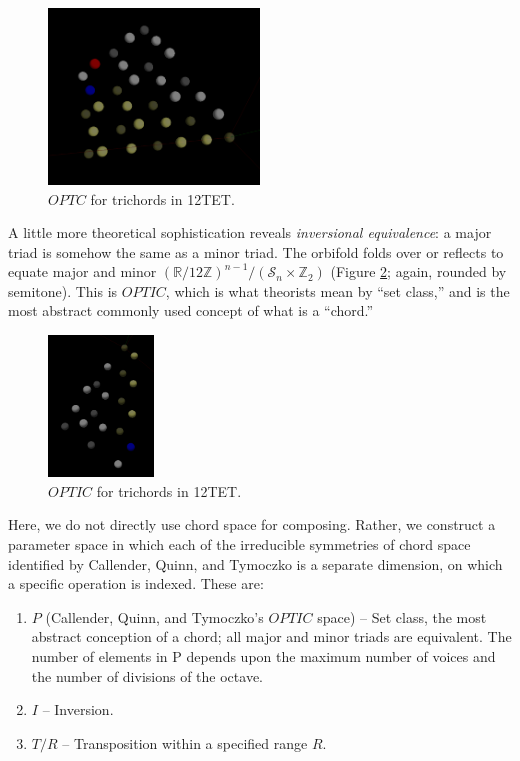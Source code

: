 \documentclass[english,11pt,letterpaper,onecolumn]{scrartcl}
\numberwithin{equation}{section}
\begin{document}
\begin{figure}
\centerline{\includegraphics[width = 0.5\textwidth]{opttc}}
\caption{\label{fig:opttc}
  $OPTC$ for trichords in 12TET.}
\end{figure}

A little more theoretical sophistication reveals \textit{inversional
equivalence}: a major triad is somehow the same as a minor triad. The orbifold
folds over or reflects to equate major and minor
$\left(\mathbb{R}/12\mathbb{Z}\right)^{n-1}/(\mathcal{S}_{n} \times
\mathbb{Z}_{2})$ (Figure \ref{fig:optic}; again, rounded by semitone). This is
$OPTIC$, which is what theorists mean by ``set class,'' and is the most abstract
commonly used concept of what is a ``chord.''

\begin{figure}
\centerline{\includegraphics[width = 0.25\textwidth]{opttic}}
\caption{\label{fig:optic}
  $OPTIC$ for trichords in 12TET.}
\end{figure}

Here, we do not directly use chord space for composing. Rather, we construct a parameter
space in which each of the irreducible symmetries of chord space identified by
Callender, Quinn, and Tymoczko is a separate dimension, on which a specific
operation is indexed. These are:

\begin{enumerate}
\item $P$ (Callender, Quinn, and Tymoczko's $OPTIC$ space) -- Set class, the
most abstract conception of a chord; all major and minor triads are equivalent.
The number of elements in P depends upon the maximum number of voices and the
number of divisions of the octave.
\item $I$ -- Inversion.
\item $T/R$ -- Transposition within a specified range $R$.
\end{enumerate}
\end{document}
